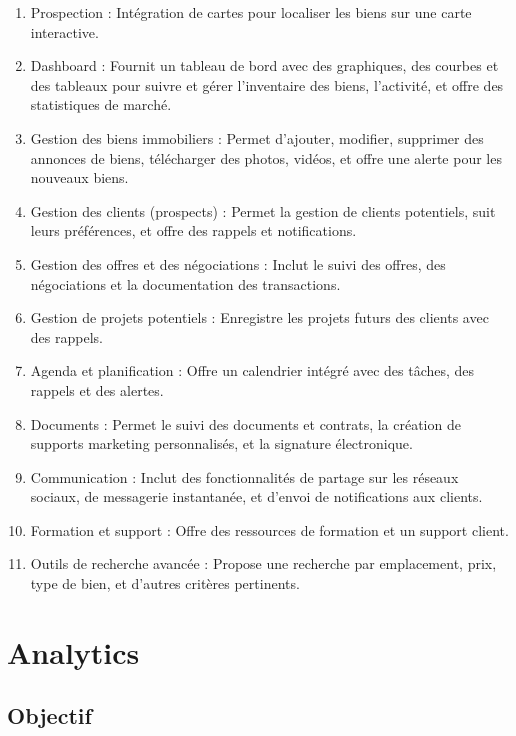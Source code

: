 \documentclass[a4paper, 12pt, twoside]{report}
\begin{document}
\begin{enumerate}
            \item Prospection : Intégration de cartes pour localiser les biens sur une carte interactive.
            \item Dashboard : Fournit un tableau de bord avec des graphiques, des courbes et des tableaux pour suivre et gérer l’inventaire des biens, l’activité, et offre des statistiques de marché.
	\item Gestion des biens immobiliers : Permet d’ajouter, modifier, supprimer des annonces de biens, télécharger des photos, vidéos, et offre une alerte pour les nouveaux biens.
	\item Gestion des clients (prospects) : Permet la gestion de clients potentiels, suit leurs préférences, et offre des rappels et notifications.
	\item Gestion des offres et des négociations : Inclut le suivi des offres, des négociations et la documentation des transactions.
	\item Gestion de projets potentiels : Enregistre les projets futurs des clients avec des rappels.
	\item Agenda et planification : Offre un calendrier intégré avec des tâches, des rappels et des alertes.
	\item Documents : Permet le suivi des documents et contrats, la création de supports marketing personnalisés, et la signature électronique.
	\item Communication : Inclut des fonctionnalités de partage sur les réseaux sociaux, de messagerie instantanée, et d’envoi de notifications aux clients.
	\item Formation et support : Offre des ressources de formation et un support client.
	\item Outils de recherche avancée : Propose une recherche par emplacement, prix, type de bien, et d’autres critères pertinents. \\
\end{enumerate}

\chapter{Analytics}

	\section{Objectif}
\end{document}
